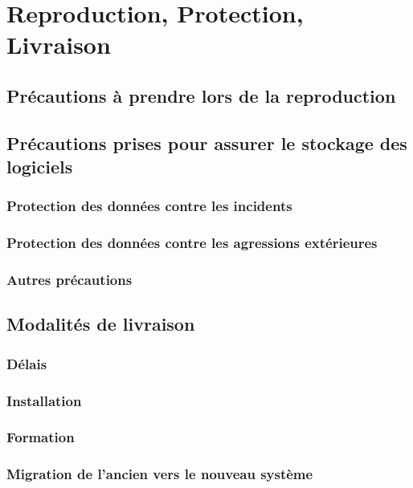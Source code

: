 \section{Reproduction, Protection, Livraison}

\subsection{Précautions à prendre lors de la reproduction}

\subsection{Précautions prises pour assurer le stockage des logiciels}

\subsubsection{Protection des données contre les incidents}

\subsubsection{Protection des données contre les agressions extérieures}

\subsubsection{Autres précautions}

\subsection{Modalités de livraison}

\subsubsection{Délais}

\subsubsection{Installation}

\subsubsection{Formation}

\subsubsection{Migration de l'ancien vers le nouveau système}
